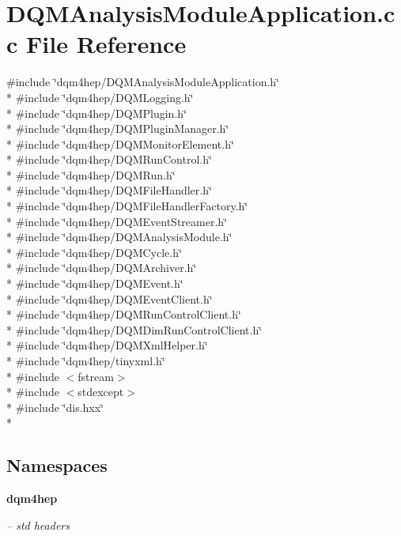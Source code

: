 \section{D\+Q\+M\+Analysis\+Module\+Application.\+cc File Reference}
\label{DQMAnalysisModuleApplication_8cc}
{\ttfamily \#include \char`\"{}dqm4hep/\+D\+Q\+M\+Analysis\+Module\+Application.\+h\char`\"{}}\\*
{\ttfamily \#include \char`\"{}dqm4hep/\+D\+Q\+M\+Logging.\+h\char`\"{}}\\*
{\ttfamily \#include \char`\"{}dqm4hep/\+D\+Q\+M\+Plugin.\+h\char`\"{}}\\*
{\ttfamily \#include \char`\"{}dqm4hep/\+D\+Q\+M\+Plugin\+Manager.\+h\char`\"{}}\\*
{\ttfamily \#include \char`\"{}dqm4hep/\+D\+Q\+M\+Monitor\+Element.\+h\char`\"{}}\\*
{\ttfamily \#include \char`\"{}dqm4hep/\+D\+Q\+M\+Run\+Control.\+h\char`\"{}}\\*
{\ttfamily \#include \char`\"{}dqm4hep/\+D\+Q\+M\+Run.\+h\char`\"{}}\\*
{\ttfamily \#include \char`\"{}dqm4hep/\+D\+Q\+M\+File\+Handler.\+h\char`\"{}}\\*
{\ttfamily \#include \char`\"{}dqm4hep/\+D\+Q\+M\+File\+Handler\+Factory.\+h\char`\"{}}\\*
{\ttfamily \#include \char`\"{}dqm4hep/\+D\+Q\+M\+Event\+Streamer.\+h\char`\"{}}\\*
{\ttfamily \#include \char`\"{}dqm4hep/\+D\+Q\+M\+Analysis\+Module.\+h\char`\"{}}\\*
{\ttfamily \#include \char`\"{}dqm4hep/\+D\+Q\+M\+Cycle.\+h\char`\"{}}\\*
{\ttfamily \#include \char`\"{}dqm4hep/\+D\+Q\+M\+Archiver.\+h\char`\"{}}\\*
{\ttfamily \#include \char`\"{}dqm4hep/\+D\+Q\+M\+Event.\+h\char`\"{}}\\*
{\ttfamily \#include \char`\"{}dqm4hep/\+D\+Q\+M\+Event\+Client.\+h\char`\"{}}\\*
{\ttfamily \#include \char`\"{}dqm4hep/\+D\+Q\+M\+Run\+Control\+Client.\+h\char`\"{}}\\*
{\ttfamily \#include \char`\"{}dqm4hep/\+D\+Q\+M\+Dim\+Run\+Control\+Client.\+h\char`\"{}}\\*
{\ttfamily \#include \char`\"{}dqm4hep/\+D\+Q\+M\+Xml\+Helper.\+h\char`\"{}}\\*
{\ttfamily \#include \char`\"{}dqm4hep/tinyxml.\+h\char`\"{}}\\*
{\ttfamily \#include $<$fstream$>$}\\*
{\ttfamily \#include $<$stdexcept$>$}\\*
{\ttfamily \#include \char`\"{}dis.\+hxx\char`\"{}}\\*
\subsection*{Namespaces}
\begin{DoxyCompactItemize}
\item 
 {\bf dqm4hep}
\begin{DoxyCompactList}\small\item\em -- std headers \end{DoxyCompactList}\end{DoxyCompactItemize}
